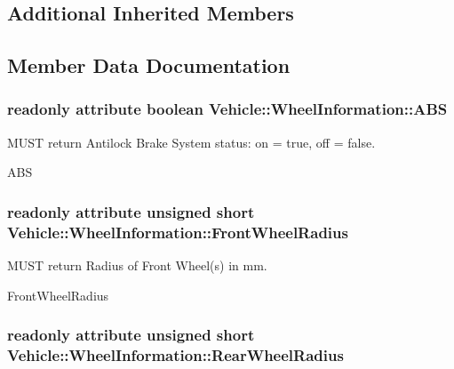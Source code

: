 \subsection*{Additional Inherited Members}


\subsection{Member Data Documentation}
\hypertarget{interfaceVehicle_1_1WheelInformation_a0f79cf84bcfeecd2cb98f3cce0e440b4}{
\subsubsection[{A\-B\-S}]{\setlength{\rightskip}{0pt plus 5cm}readonly attribute boolean Vehicle\-::\-Wheel\-Information\-::\-A\-B\-S}}\label{interfaceVehicle_1_1WheelInformation_a0f79cf84bcfeecd2cb98f3cce0e440b4}


M\-U\-S\-T return Antilock Brake System status\-: on = true, off = false. 

A\-B\-S \hypertarget{interfaceVehicle_1_1WheelInformation_a5589adcf5abf655ab247d50778b9e187}{
\subsubsection[{Front\-Wheel\-Radius}]{\setlength{\rightskip}{0pt plus 5cm}readonly attribute unsigned short Vehicle\-::\-Wheel\-Information\-::\-Front\-Wheel\-Radius}}\label{interfaceVehicle_1_1WheelInformation_a5589adcf5abf655ab247d50778b9e187}


M\-U\-S\-T return Radius of Front Wheel(s) in mm. 

Front\-Wheel\-Radius \hypertarget{interfaceVehicle_1_1WheelInformation_a3ef4e44bfe9d502d64711c9afc14f905}{
\subsubsection[{Rear\-Wheel\-Radius}]{\setlength{\rightskip}{0pt plus 5cm}readonly attribute unsigned short Vehicle\-::\-Wheel\-Information\-::\-Rear\-Wheel\-Radius}}\label{interfaceVehicle_1_1WheelInformation_a3ef4e44bfe9d502d64711c9afc14f905}


